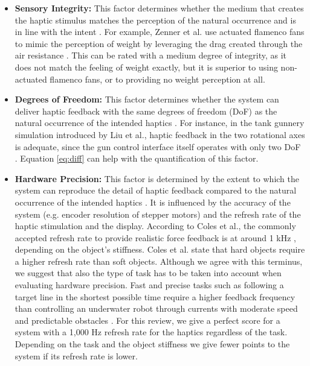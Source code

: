 \begin{itemize}
    \item \textbf{Sensory Integrity:}
    This factor determines whether the medium that creates the haptic stimulus matches the perception of the natural occurrence and is in line with the intent \cite{Muender2022HapticReality}. For example, Zenner et al. use actuated flamenco fans to mimic the perception of weight by leveraging the drag created through the air resistance \cite{Zenner2019}. This can be rated with a medium degree of integrity, as it does not match the feeling of weight exactly, but it is superior to using non-actuated flamenco fans, or to providing no weight perception at all.
    
    \item \textbf{Degrees of Freedom:}
    This factor determines whether the system can deliver haptic feedback with the same degrees of freedom (DoF) as the natural occurrence of the intended haptics \cite{Muender2022HapticReality}. For instance, in the tank gunnery simulation introduced by Liu et al., haptic feedback in the two rotational axes is adequate, since the gun control interface itself operates with only two DoF \cite{LiuG2014}. Equation \ref{eq:diff} can help with the quantification of this factor.
    
    \item \textbf{Hardware Precision:}
    This factor is determined by the extent to which the system can reproduce the detail of haptic feedback compared to the natural occurrence of the intended haptics \cite{Muender2022HapticReality}. 
    It is influenced by the accuracy of the system (e.g. encoder resolution of stepper motors) and the refresh rate of the haptic stimulation and the display. According to Coles et al., the commonly accepted refresh rate to provide realistic force feedback is at around 1 kHz \cite{Coles2011TheArt}, depending on the object's stiffness. Coles et al. state that hard objects require a higher refresh rate than soft objects. Although we agree with this terminus, we suggest that also the type of task has to be taken into account when evaluating hardware precision. Fast and precise tasks such as following a target line in the shortest possible time \cite{Fehlberg2012} require a higher feedback frequency than controlling an underwater robot through currents with moderate speed and predictable obstacles \cite{Xia2023}.
    For this review, we give a perfect score for a system with a 1,000 Hz refresh rate for the haptics regardless of the task. Depending on the task and the object stiffness we give fewer points to the system if its refresh rate is lower.


\end{itemize}
